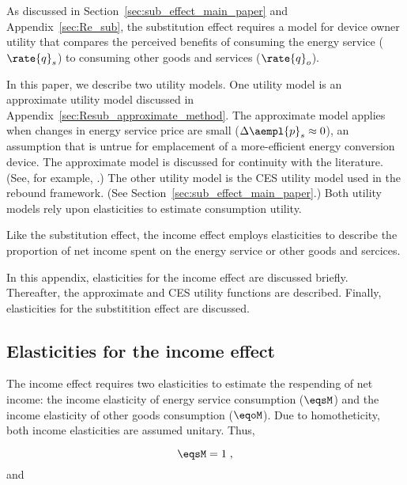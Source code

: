 

As discussed in Section~\ref{sec:sub_effect_main_paper}
and Appendix~\ref{sec:Re_sub}, 
the substitution effect requires a model for device owner utility
that compares the perceived benefits of 
consuming the energy service ($\rate{q}_s$) to
consuming other goods and services ($\rate{q}_o$).

In this paper, we describe two utility models.
One utility model is an approximate utility model
discussed in Appendix~\ref{sec:Resub_approximate_method}.
The approximate model applies when
changes in energy service price are small ($\Delta \aempl{p}_s \approx 0$), 
an assumption that is untrue for emplacement of a more-efficient energy conversion device.
The approximate model is discussed for continuity with the literature.
(See, for example, \citet{Borenstein:2015aa}.)
The other utility model is the CES utility model used in the rebound framework.
(See Section~\ref{sec:sub_effect_main_paper}.)
Both utility models rely upon elasticities to estimate consumption utility.

Like the substitution effect,
the income effect employs elasticities
to describe the proportion of net income spent on the energy service
or other goods and sercices.

In this appendix,
elasticities for the income effect are discussed briefly. 
Thereafter, the approximate and CES utility functions are described.
Finally, elasticities for the substitition effect are 
discussed.


\subsection{Elasticities for the income effect}
\label{sec:income_elasticities}

The income effect requires two elasticities to 
estimate the respending of net income:
the income elasticity of energy service consumption ($\eqsM$) and
the income elasticity of other goods consumption ($\eqoM$).
Due to homotheticity,
both income elasticities are assumed unitary. 
Thus, 

\begin{equation} \label{eq:eqsM}
  \eqsM = 1 \; ,
\end{equation}
%
and

